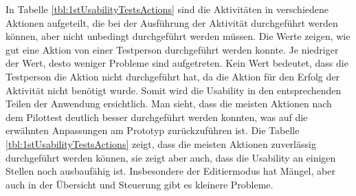 In Tabelle \ref{tbl:1stUsabilityTestsActions} sind die Aktivitäten in verschiedene Aktionen aufgeteilt, die bei der Ausführung der Aktivität durchgeführt werden können, aber nicht unbedingt durchgeführt werden müssen. Die Werte zeigen, wie gut eine Aktion von einer Testperson durchgeführt werden konnte. Je niedriger der Wert, desto weniger Probleme sind aufgetreten. Kein Wert bedeutet, dass die Testperson die Aktion nicht durchgeführt hat, da die Aktion für den Erfolg der Aktivität nicht benötigt wurde. Somit wird die Usability in den entsprechenden Teilen der Anwendung ersichtlich. Man sieht, dass die meisten Aktionen nach dem Pilottest deutlich besser durchgeführt werden konnten, was auf die erwähnten Anpassungen am Prototyp zurückzuführen ist. Die Tabelle \ref{tbl:1stUsabilityTestsActions} zeigt, dass die meisten Aktionen zuverlässig durchgeführt werden können, sie zeigt aber auch, dass die Usability an einigen Stellen noch ausbaufähig ist. Insbesondere der Editiermodus hat Mängel, aber auch in der Übersicht und Steuerung gibt es kleinere Probleme.



